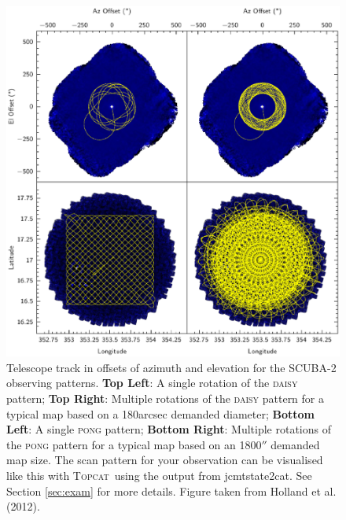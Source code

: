 \documentclass[twoside,11pt]{article}
\newcommand{\htmladdnormallink}[2]{#1}
\newcommand{\xref}[3]{#1}
\renewcommand{\_}{\texttt{\symbol{95}}}
\newcommand{\topcat}{\htmladdnormallink{\textsc{Topcat}}{http://www.starlink.ac.uk/topcat}}
\newcommand{\task}[1]{\textsf{#1}}
\newcommand{\jcmtstate}{\xref{\task{jcmtstate2cat}}{sun258}{JCMTSTATE2CAT}}
\begin{document}
\begin{figure}[b!]
\begin{center}
\includegraphics[width=0.9\linewidth]{wayne_scan.eps}
\caption{\small Telescope track in offsets of azimuth and elevation for the SCUBA-2 observing patterns. \textbf{Top Left}: A single rotation of the \textsc{daisy} pattern; \textbf{Top Right}: Multiple rotations of the \textsc{daisy} pattern for a typical map based on a 180arcsec demanded diameter; \textbf{Bottom Left}: A single \textsc{pong} pattern; \textbf{Bottom Right}: Multiple rotations of the \textsc{pong} pattern for a typical map based on an 1800$''$ demanded map size. The scan pattern for your observation can be visualised like this with \topcat\ using the output from \jcmtstate. See Section \ref{sec:exam} for more details. Figure taken from Holland et al. (2012).}
\label{fig:scan}
\end{center}
\end{figure}

\clearpage
\end{document}
